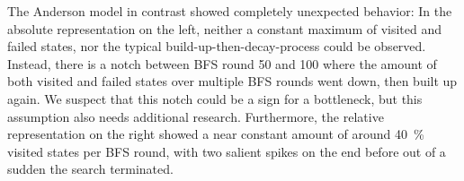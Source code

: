 \documentclass[
fancyheadings, %
%
%
]{stsreprt}
\begin{document}
The Anderson model in contrast showed completely unexpected behavior:
In the absolute representation on the left, neither a constant maximum of visited and failed states, nor the typical build-up-then-decay-process could be observed.
Instead, there is a notch between BFS round 50 and 100 where the amount of both visited and failed states over multiple BFS rounds went down, then built up again.
We suspect that this notch could be a sign for a bottleneck, but this assumption also needs additional research.
Furthermore, the relative representation on the right showed a near constant amount of around \SI{40}{\percent} visited states per BFS round, with two salient spikes on the end before out of a sudden the search terminated.

\end{document}
